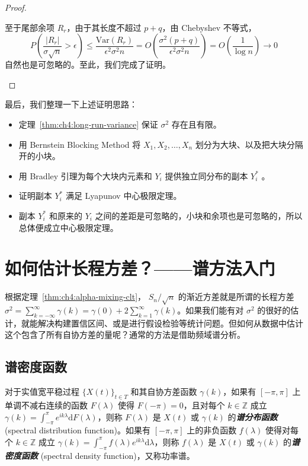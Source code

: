 \begin{proof}
\begin{enumerate}[label=\textbf{第\chinese*步}:, leftmargin=4em]
至于尾部余项 $R_r$，由于其长度不超过 $p+q$，由 Chebyshev 不等式，
\[P\left( \frac{|R_r|}{\sigma \sqrt{n}} > \epsilon \right) \leq \frac{\mathrm{Var}(R_r)}{\epsilon^2 \sigma^2 n} = O\left( \frac{\sigma^2(p+q)}{\epsilon^2\sigma^2n} \right) = O\left( \frac{1}{\log n} \right) \to 0\]
自然也是可忽略的。至此，我们完成了证明。
\end{enumerate}
\end{proof}

最后，我们整理一下上述证明思路：

\begin{itemize}
\tightlist
\item
  定理~\ref{thm:ch4:long-run-variance} 保证 $\sigma^2$ 存在且有限。
\item
  用 Bernstein Blocking Method 将 $X_1,X_2,\dots,X_n$ 划分为大块、以及把大块分隔开的小块。
\item
  用 Bradley 引理为每个大块内元素和 $Y_i$ 提供独立同分布的副本 $Y_i^*$ 。
\item
  证明副本 $Y_i^*$ 满足 Lyapunov 中心极限定理。
\item
  副本 $Y_i^*$ 和原来的 $Y_i$ 之间的差距是可忽略的，小块和余项也是可忽略的，所以总体便成立中心极限定理。
\end{itemize}

\section{如何估计长程方差？------谱方法入门}

根据定理~\ref{thm:ch4:alpha-mixing-clt}， $S_n/\sqrt n$ 的渐近方差就是所谓的长程方差 $\sigma^2 = \sum_{k=-\infty}^\infty \gamma(k)=\gamma(0)+2\sum_{k=1}^\infty\gamma(k)$。如果我们能有对 $\sigma^2$ 的很好的估计，就能解决构建置信区间、或是进行假设检验等统计问题。但如何从数据中估计这个包含了所有自协方差的量呢？通常的方法是借助频域谱分析。

\subsection{谱密度函数}

\begin{definition*}[谱分布函数与谱密度函数]
对于实值宽平稳过程 $\{X(t)\}_{t\in T}$ 和其自协方差函数 $\gamma(k)$，如果有 $[-\pi,\pi]$ 上单调不减右连续的函数 $F(\lambda)$ 使得 $F(-\pi)=0$，且对每个 $k\in\mathbb Z$ 成立 $\gamma(k)=\int_{-\pi}^\pi e^{ik\lambda}\mathrm{d}F(\lambda)$，则称 $F(\lambda)$ 是 $X(t)$ 或 $\gamma(k)$ 的\textbf{\emph{谱分布函数}} (spectral distribution function)。如果有 $[-\pi,\pi]$ 上的非负函数 $f(\lambda)$ 使得对每个 $k\in\mathbb Z$ 成立 $\gamma(k)=\int_{-\pi}^\pi f(\lambda)e^{ik\lambda}\mathrm{d}\lambda$，则称 $f(\lambda)$ 是 $X(t)$ 或 $\gamma(k)$ 的\textbf{\emph{谱密度函数}} (spectral density function)，又称功率谱。
\end{definition*}

